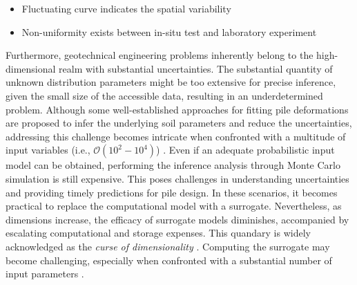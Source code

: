 
\begin{itemize}[left=0pt]

    \item Fluctuating curve indicates the spatial variability
    \item Non-uniformity exists between in-situ test and laboratory experiment

\end{itemize}
\vspace{0.2cm}

Furthermore, geotechnical engineering problems inherently belong to the high-dimensional realm with substantial uncertainties. The substantial quantity of unknown distribution parameters might be too extensive for precise inference, given the small size of the accessible data, resulting in an underdetermined problem. Although some well-established approaches for fitting pile deformations are proposed to infer the underlying soil parameters and reduce the uncertainties, addressing this challenge becomes intricate when confronted with a multitude of input variables (i.e., $\mathcal{O}(10^2-10^4)$) \citep{lataniotis2019}. 
Even if an adequate probabilistic input model can be obtained, performing the inference analysis through Monte Carlo simulation is still expensive. This poses challenges in understanding uncertainties and providing timely predictions for pile design. In these scenarios, it becomes practical to replace the computational model with a surrogate. Nevertheless, as dimensions increase, the efficacy of surrogate models diminishes, accompanied by escalating computational and storage expenses. This quandary is widely acknowledged as the \textit{curse of dimensionality} \citep{verleysen2005}. Computing the surrogate may become challenging, especially when confronted with a substantial number of input parameters \citep{lataniotis2019}.


